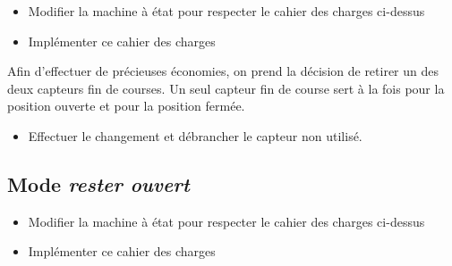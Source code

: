 \documentclass[11pt]{article}
\begin{document}
\begin{UPSTIactivite}
	\begin{itemize}
		\item Modifier la machine à état pour respecter le cahier des charges ci-dessus
		\item Implémenter ce cahier des charges
	\end{itemize}

	Afin d'effectuer de précieuses économies, on prend la décision de retirer un des deux capteurs fin de courses. Un seul capteur fin de course sert à la fois pour la position ouverte et pour la position fermée. 

	\begin{itemize}
		\item Effectuer le changement et débrancher le capteur non utilisé.
	\end{itemize}
\end{UPSTIactivite}
\subsection{Mode \textit{rester ouvert}}


\begin{UPSTIactivite}
	\begin{itemize}
		\item Modifier la machine à état pour respecter le cahier des charges ci-dessus
		\item Implémenter ce cahier des charges
	\end{itemize}
\end{UPSTIactivite}
\end{document}
